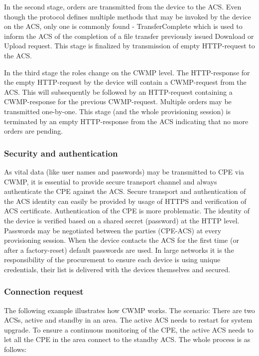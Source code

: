 In the second stage, orders are transmitted from the device to the ACS. Even though the protocol defines multiple methods that may be invoked by the device on the ACS, only one is commonly found - TransferComplete which is used to inform the ACS of the completion of a file transfer previously issued Download or Upload request. This stage is finalized by transmission of empty HTTP-request to the ACS.

In the third stage the roles change on the CWMP level. The HTTP-response for the empty HTTP-request by the device will contain a CWMP-request from the ACS. This will subsequently be followed by an HTTP-request containing a CWMP-response for the previous CWMP-request. Multiple orders may be transmitted one-by-one. This stage (and the whole provisioning session) is terminated by an empty HTTP-response from the ACS indicating that no more orders are pending.



\subsubsection{Security and authentication}
As vital data (like user names and passwords) may be transmitted to CPE via CWMP, it is essential to provide secure transport channel and always authenticate the CPE against the ACS. Secure transport and authentication of the ACS identity can easily be provided by usage of HTTPS and verification of ACS certificate. Authentication of the CPE is more problematic. The identity of the device is verified based on a shared secret (password) at the HTTP level. Passwords may be negotiated between the parties (CPE-ACS) at every provisioning session. When the device contacts the ACS for the first time (or after a factory-reset) default passwords are used. In large networks it is the responsibility of the procurement to ensure each device is using unique credentials, their list is delivered with the devices themselves and secured.


\subsubsection{Connection request}

The following example illustrates how CWMP works. The scenario: There are two ACSs, active and standby in an area. The active ACS needs to restart for system upgrade. To ensure a continuous monitoring of the CPE, the active ACS needs to let all the CPE in the area connect to the standby ACS. The whole process is as follows:


